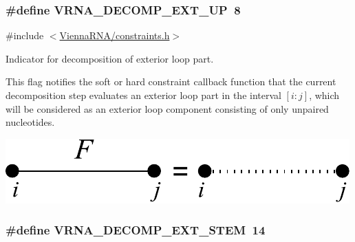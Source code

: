 \subsubsection[{V\+R\+N\+A\+\_\+\+D\+E\+C\+O\+M\+P\+\_\+\+E\+X\+T\+\_\+\+U\+P}]{\setlength{\rightskip}{0pt plus 5cm}\#define V\+R\+N\+A\+\_\+\+D\+E\+C\+O\+M\+P\+\_\+\+E\+X\+T\+\_\+\+U\+P~8}\label{group__constraints_gaff1ddaffe86d984623910b40cc8a8717}


{\ttfamily \#include $<$\hyperlink{constraints_8h}{Vienna\+R\+N\+A/constraints.\+h}$>$}



Indicator for decomposition of exterior loop part. 

This flag notifies the soft or hard constraint callback function that the current decomposition step evaluates an exterior loop part in the interval $[i:j]$, which will be considered as an exterior loop component consisting of only unpaired nucleotides.

 
\begin{DoxyImageNoCaption}
  \mbox{\includegraphics[width=\textwidth,height=\textheight/2,keepaspectratio=true]{decomp_ext_up}}
\end{DoxyImageNoCaption}
 \hypertarget{group__constraints_gae44b5ace0d9b4a29088069ecb4cec441}{}
\subsubsection[{V\+R\+N\+A\+\_\+\+D\+E\+C\+O\+M\+P\+\_\+\+E\+X\+T\+\_\+\+S\+T\+E\+M}]{\setlength{\rightskip}{0pt plus 5cm}\#define V\+R\+N\+A\+\_\+\+D\+E\+C\+O\+M\+P\+\_\+\+E\+X\+T\+\_\+\+S\+T\+E\+M~14}\label{group__constraints_gae44b5ace0d9b4a29088069ecb4cec441}


